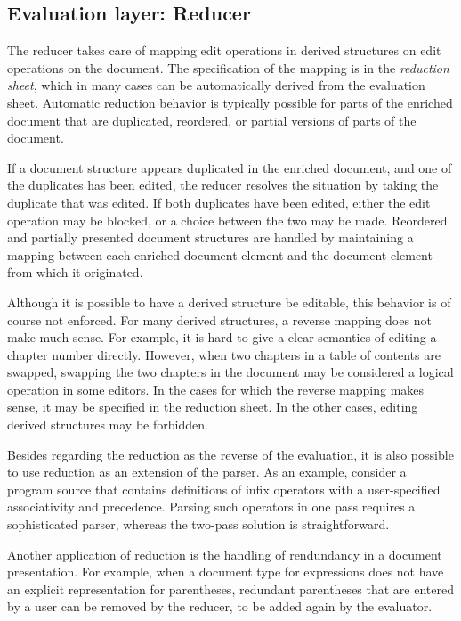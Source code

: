 %																
\subsection{Evaluation layer: Reducer} \label{sect:reducer}

The reducer takes care of mapping edit operations in derived structures on edit operations on the document. The specification of the mapping is in the {\em reduction sheet}, which in many cases can be automatically derived from the evaluation sheet. Automatic reduction behavior is typically possible for parts of the enriched document that are duplicated, reordered, or partial versions of parts of the document. 

If a document structure appears duplicated in the enriched document, and one of the duplicates has been edited, the reducer resolves the situation by taking the duplicate that was edited. If both duplicates have been edited, either the edit operation may be blocked, or a choice between the two may be made. Reordered and partially presented document structures are handled by maintaining a mapping between each enriched document element and the document element from which it originated.

Although it is possible to have a derived structure be editable, this behavior is of course not enforced. For many derived structures, a reverse mapping does not make much sense. For example, it is hard to give a clear semantics of editing a chapter number directly. However, when two chapters in a table of contents are swapped, swapping the two chapters in the document may be considered a logical operation in some editors. In the cases for which the reverse mapping makes sense, it may be specified in the reduction sheet. In the other cases, editing derived structures may be forbidden.

Besides regarding the reduction as the reverse of the evaluation, it is also possible to use reduction as an extension of the parser. As an example, consider a program source that contains definitions of infix operators with a user-specified associativity and precedence. Parsing such operators in one pass requires a sophisticated parser, whereas the two-pass solution is straightforward.

Another application of reduction is the handling of rendundancy in a document presentation. For example, when a document type for expressions does not have an explicit representation for parentheses, redundant parentheses that are entered by a user can be removed by the reducer, to be added again by the evaluator.

